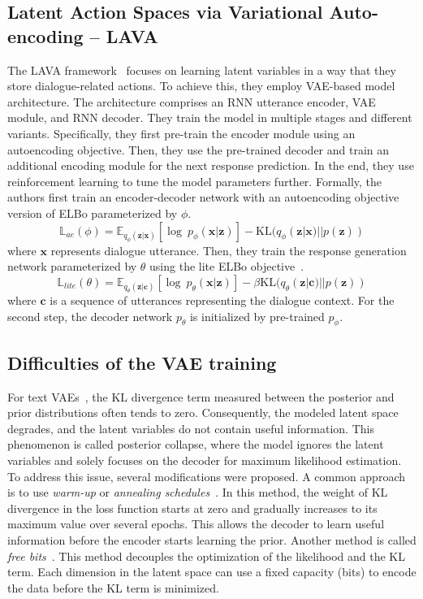 \subsection{Latent Action Spaces via Variational Auto-encoding -- LAVA}
\label{02:sec:lava}
The LAVA framework~\cite{lubis-etal-2020-lava} focuses on learning latent variables in a way that they store dialogue-related actions.
To achieve this, they employ VAE-based model architecture.
The architecture comprises an RNN utterance encoder, VAE module, and RNN decoder.
They train the model in multiple stages and different variants.
Specifically, they first pre-train the encoder module using an autoencoding objective.
Then, they use the pre-trained decoder and train an additional encoding module for the next response prediction.
In the end, they use reinforcement learning to tune the model parameters further.
Formally, the authors first train an encoder-decoder network with an autoencoding objective version of ELBo parameterized by $\phi$.
\begin{equation}
    \mathbb{L}_{ae}(\phi) = \mathbb{E}_{q_{\phi}(\mathbf{z}|\mathbf{x})}[\log~p_{\phi}(\mathbf{x}|\mathbf{z})] -\mathrm{KL}(q_{\phi}(\mathbf{z}|\mathbf{x})||p(\mathbf{z}))
\end{equation}
where $\mathbf{x}$ represents dialogue utterance.
Then, they train the response generation network parameterized by $\theta$ using the lite ELBo objective~\cite{lubis-etal-2020-lava}.
\begin{equation}
    \mathbb{L}_{lite}(\theta) = \mathbb{E}_{q_{\theta}(\mathbf{z}|\mathbf{c})}[\log~p_{\theta}(\mathbf{x}|\mathbf{z})] - \beta\mathrm{KL}(q_{\theta}(\mathbf{z}|\mathbf{c})||p(\mathbf{z}))
\end{equation}
where $\mathbf{c}$ is a sequence of utterances representing the dialogue context.
For the second step, the decoder network $p_{\theta}$ is initialized by pre-trained $p_{\phi}$.

\subsection{Difficulties of the VAE training}
\label{background:vae-problems}
For text VAEs~\citep{bowman-etal-2016-generating}, the KL divergence term measured between the posterior and prior distributions often tends to zero.
Consequently, the modeled latent space degrades, and the latent variables do not contain useful information.
This phenomenon is called posterior collapse, where the model ignores the latent variables and solely focuses on the decoder for maximum likelihood estimation.
To address this issue, several modifications were proposed.
A common approach is to use \emph{warm-up} or \emph{annealing schedules}~\cite {fu-etal-2019-cyclical}.
In this method, the weight of KL divergence in the loss function starts at zero and gradually increases to its maximum value over several epochs.
This allows the decoder to learn useful information before the encoder starts learning the prior.
Another method is called \emph{free bits}~\cite{li2019surprisingly}.
This method decouples the optimization of the likelihood and the KL term.
Each dimension in the latent space can use a fixed capacity (bits) to encode the data before the KL term is minimized.

